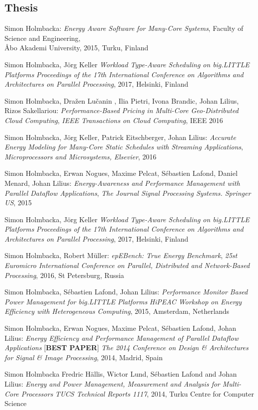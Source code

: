 \documentclass[margin,line]{resume}
\begin{document}
\begin{resume}
\section{\mysidestyle Thesis}    
Simon Holmbacka:
\textit{Energy Aware Software for Many-Core Systems},
Faculty of Science and Engineering,\\ \AA{}bo Akademi University, 2015, Turku, Finland

Simon Holmbacka, J\"{o}rg Keller
\textit{Workload Type-Aware Scheduling on big.LITTLE Platforms}
\textsl{Proceedings of the 17th International Conference on Algorithms and Architectures on Parallel Processing}, 2017, Helsinki, Finland

Simon Holmbacka, Dra\v{z}en Lu\v{c}anin , Ilia Pietri, Ivona Brandic, Johan Lilius, Rizos Sakellariou:
\textit{Performance-Based Pricing in Multi-Core Geo-Distributed Cloud Computing}, 
\textsl{IEEE Transactions on Cloud Computing}, IEEE 2016

Simon Holmbacka, J\"{o}rg Keller, Patrick Eitschberger, Johan Lilius:
\textit{Accurate Energy Modeling for Many-Core Static Schedules with Streaming Applications}, 
\textsl{Microprocessors and Microsystems, Elsevier}, 2016

Simon Holmbacka, Erwan Nogues, Maxime Pelcat, S\'{e}bastien Lafond, Daniel Menard, Johan Lilius:
\textit{Energy-Awareness and Performance Management with Parallel Dataflow Applications}, 
\textsl{The Journal Signal Processing Systems. Springer US}, 2015

Simon Holmbacka, J\"{o}rg Keller
\textit{Workload Type-Aware Scheduling on big.LITTLE Platforms}
\textsl{Proceedings of the 17th International Conference on Algorithms and Architectures on Parallel Processing}, 2017, Helsinki, Finland

Simon Holmbacka, Robert M\"{u}ller: 
\textit{epEBench: True Energy Benchmark},
\textsl{25st Euromicro International Conference on Parallel, Distributed and Network-Based Processing}, 2016, St Petersburg, Russia

Simon Holmbacka, S\'{e}bastien Lafond, Johan Lilius:
\textit{Performance Monitor Based Power Management for big.LITTLE Platforms}
\textsl{HiPEAC Workshop on Energy Efficiency with Heterogeneous Computing}, 2015, Amsterdam, Netherlands

Simon Holmbacka, Erwan Nogues, Maxime Pelcat, S\'{e}bastien Lafond, Johan Lilius:
\textit{Energy Efficiency and Performance Management of Parallel Dataflow Applications} [\textbf{BEST PAPER}]
\textsl{The 2014 Conference on Design \& Architectures for Signal \& Image Processing}, 2014, Madrid, Spain

Simon Holmbacka Fredric H\"{a}llis, Wictor Lund, S\'{e}bastien Lafond and Johan Lilius:
\textit{Energy and Power Management, Measurement and Analysis for Multi-Core Processors} 
\textsl{TUCS Technical Reports 1117}, 2014, Turku Centre for Computer Science 







\end{resume}
\end{document}
